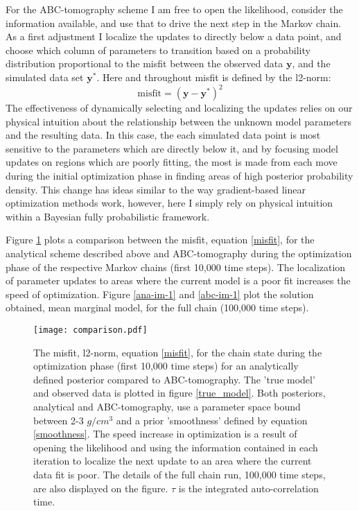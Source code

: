 For the ABC-tomography scheme I am free to open the likelihood, consider the information available, and use that to drive the next step in the Markov chain. As a first adjustment I localize the updates to directly below a data point, and choose which column of parameters to transition based on a probability distribution proportional to the misfit between the observed data $\bm{y}$, and the simulated data set $\bm{y^*}$. Here and throughout misfit is defined by the l2-norm:
\begin{equation}
	\text{misfit} = (\bm{y}-\bm{y^*})^2
	\label{misfit}
\end{equation}
The effectiveness of dynamically selecting and localizing the updates relies on our physical intuition about the relationship between the unknown model parameters and the resulting data. In this case, the each simulated data point is most sensitive to the parameters which are directly below it, and by focusing model updates on regions which are poorly fitting, the most is made from each move during the initial optimization phase in finding areas of high posterior probability density. This change has ideas similar to the way gradient-based linear optimization methods work, however, here I simply rely on physical intuition within a Bayesian fully probabilistic framework. \par
Figure \ref{comparison-1} plots a comparison between the misfit, equation \ref{misfit}, for the analytical scheme described above and ABC-tomography during the optimization phase of the respective Markov chains (first 10,000 time steps). The localization of parameter updates to areas where the current model is a poor fit increases the speed of optimization. Figure \ref{ana-im-1} and \ref{abc-im-1} plot the solution obtained, mean marginal model, for the full chain (100,000 time steps).\par

\begin{figure}[H]
	\centering
	\texttt{[image: comparison.pdf]}
	\caption{The misfit, l2-norm, equation \ref{misfit}, for the chain state during the optimization phase (first 10,000 time steps) for an analytically defined posterior compared to ABC-tomography. The 'true model' and observed data is plotted in figure \ref{true_model}. Both posteriors, analytical and ABC-tomography, use a parameter space bound between 2-3 $g/cm^3$ and a prior 'smoothness' defined by equation \ref{smoothness}. The speed increase in optimization is a result of opening the likelihood and using the information contained in each iteration to localize the next update to an area where the current data fit is poor. The details of the full chain run, 100,000 time steps, are also displayed on the figure. $\tau$ is the integrated auto-correlation time.}
	\label{comparison-1}
\end{figure}

